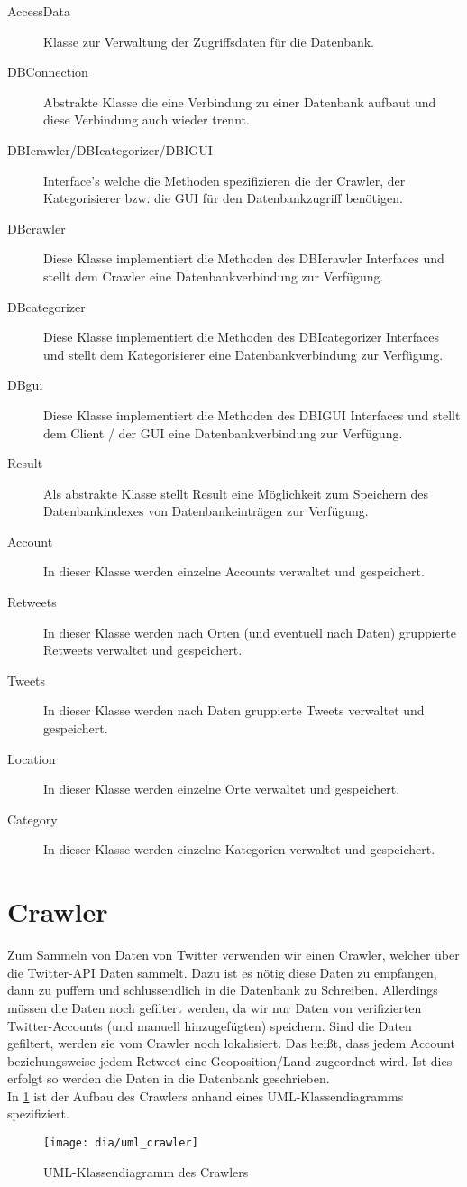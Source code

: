\begin{description}
\item[AccessData] Klasse zur Verwaltung der Zugriffsdaten für die Datenbank.
\item[DBConnection] Abstrakte Klasse die eine Verbindung zu einer Datenbank aufbaut und diese Verbindung auch wieder trennt.
\item[DBIcrawler/DBIcategorizer/DBIGUI] Interface's welche die Methoden spezifizieren die der Crawler, der Kategorisierer bzw. die GUI für den Datenbankzugriff benötigen.
\item[DBcrawler] Diese Klasse implementiert die Methoden des DBIcrawler Interfaces und stellt dem Crawler eine Datenbankverbindung zur Verfügung.
\item[DBcategorizer] Diese Klasse implementiert die Methoden des DBIcategorizer Interfaces und stellt dem Kategorisierer eine Datenbankverbindung zur Verfügung.
\item[DBgui] Diese Klasse implementiert die Methoden des DBIGUI Interfaces und stellt dem Client / der GUI eine Datenbankverbindung zur Verfügung.
\item[Result] Als abstrakte Klasse stellt Result eine Möglichkeit zum Speichern des Datenbankindexes von Datenbankeinträgen zur Verfügung.
\item[Account] In dieser Klasse werden einzelne Accounts verwaltet und gespeichert.
\item[Retweets] In dieser Klasse werden nach Orten (und eventuell nach Daten) gruppierte Retweets verwaltet und gespeichert.
\item[Tweets] In dieser Klasse werden nach Daten gruppierte Tweets verwaltet und gespeichert.
\item[Location] In dieser Klasse werden einzelne Orte verwaltet und gespeichert.
\item[Category] In dieser Klasse werden einzelne Kategorien verwaltet und gespeichert.
\end{description}

\section{Crawler}
Zum Sammeln von Daten von Twitter verwenden wir einen Crawler, welcher über die Twitter-API Daten sammelt. Dazu ist es nötig diese Daten zu empfangen, dann zu puffern und schlussendlich in die Datenbank zu Schreiben. Allerdings müssen die Daten noch gefiltert werden, da wir nur Daten von verifizierten Twitter-Accounts (und manuell hinzugefügten) speichern. Sind die Daten gefiltert, werden sie vom Crawler noch lokalisiert. Das heißt, dass jedem Account beziehungsweise jedem Retweet eine Geoposition/Land zugeordnet wird. Ist dies erfolgt so werden die Daten in die Datenbank geschrieben.
\\ In \cref{fig:uml_crawler} ist der Aufbau des Crawlers anhand eines UML-Klassendiagramms spezifiziert.
	\begin{figure}[h!]
	\centering
	\texttt{[image: dia/uml\_crawler]}
	\caption{UML-Klassendiagramm des Crawlers}
	\label{fig:uml_crawler}
\end{figure}


